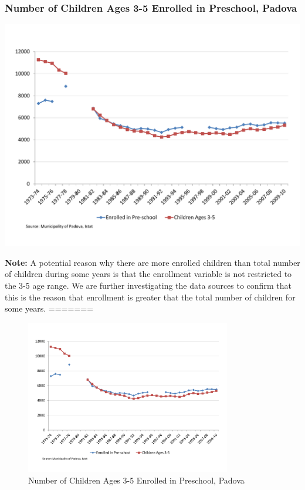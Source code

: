 \documentclass[static]{JJH-Beamer_PAGENOS}
\begin{document}
\begin{frame}
\frametitle{Number of Children Ages 3-5 Enrolled in Preschool, Padova}
\begin{center}
\includegraphics[scale=0.36]{../../output/image/Enrollement_Preschool_Padova.pdf}
\end{center}
\tiny{\textbf{Note:} A potential reason why there are more enrolled children than total number of children during some years is that the enrollment variable is not restricted to the 3-5 age range. We are further investigating the data sources to confirm that this is the reason that enrollment is greater that the total number of children for some years.}
=======
\centering
\begin{figure}[H]
\caption{Number of Children Ages 3-5 Enrolled in Preschool, Padova}
\includegraphics[width=0.8\textwidth]{../../output/image/Enrollement_Preschool_Padova.pdf}
\end{figure}

\end{frame}
\end{document}
